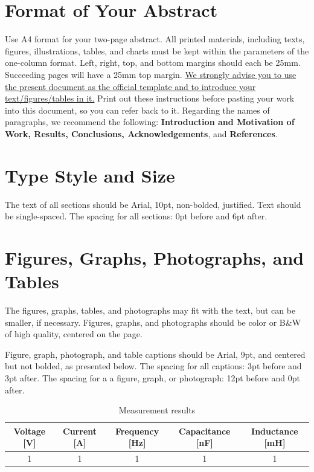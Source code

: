 \documentclass[a4paper,10pt]{article}
\begin{document}
\section*{Format of Your Abstract}

Use A4 format for your two-page abstract. All printed materials, including
texts, figures, illustrations, tables, and charts must be kept within the
parameters of the one-column format. Left, right, top, and bottom margins
should each be 25mm. Succeeding pages will have a 25mm top margin.
\ul{%
We strongly advise you to use the present document as the official template and
to introduce your text/figures/tables in it.} 
Print out these instructions before
pasting your work into this document, so you can refer back to it. Regarding
the names of paragraphs, we recommend the following: 
\textbf{Introduction and Motivation of Work, Results, Conclusions, Acknowledgements},
and \textbf{References}.

\section*{Type Style and Size}

The text of all sections should be Arial, 10pt, non-bolded, justified. Text
should be single-spaced. The spacing for all sections: 0pt before and 6pt
after. 

\section*{Figures, Graphs, Photographs, and Tables}

The figures, graphs, tables, and photographs may fit with the text, but can be
smaller, if necessary. Figures, graphs, and photographs should be color or B\&W
of high quality, centered on the page. 

Figure, graph, photograph, and table captions should be Arial, 9pt, and
centered but not bolded, as presented below. The spacing for all captions: 3pt
before and 3pt after. The spacing for a a figure, graph, or photograph: 12pt
before and 0pt after. 

\begin{table}[!htb]
    \centering
    \caption{Measurement results}\label{tab:measure}
    \smallskip
        \begin{tabular}{ | c | c | c | c | c | } \hline
            \textbf{Voltage [V]} & \textbf{Current [A]} & \textbf{Frequency [Hz]} 
                & \textbf{Capacitance [nF]} & \textbf{Inductance [mH]} \\ 
            \hline
            1 & 1 & 1 & 1 & 1 \\ 
            \hline 
        \end{tabular}
\end{table}
\end{document}
